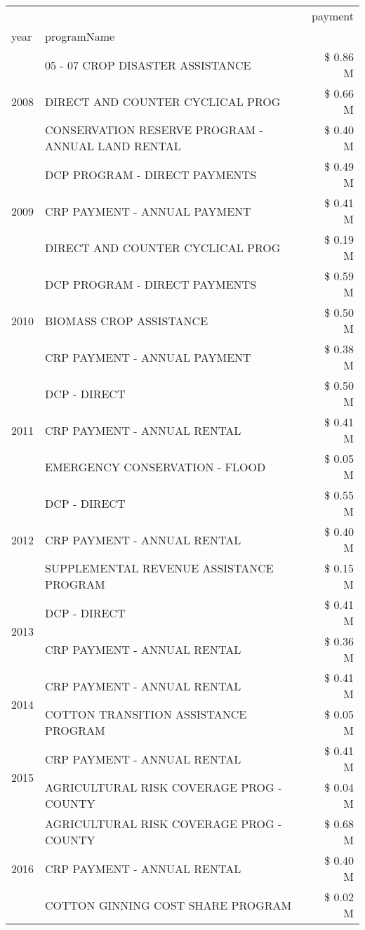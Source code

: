 \begin{tabular}{llr}
\toprule
 &  & payment \\
year & programName &  \\
\midrule
\multirow[t]{3}{*}{2008} & 05 - 07 CROP DISASTER ASSISTANCE & \$ 0.86 M \\
 & DIRECT AND COUNTER CYCLICAL PROG & \$ 0.66 M \\
 & CONSERVATION RESERVE PROGRAM - ANNUAL LAND RENTAL & \$ 0.40 M \\
\cline{1-3}
\multirow[t]{3}{*}{2009} & DCP PROGRAM - DIRECT PAYMENTS & \$ 0.49 M \\
 & CRP PAYMENT - ANNUAL PAYMENT & \$ 0.41 M \\
 & DIRECT AND COUNTER CYCLICAL PROG & \$ 0.19 M \\
\cline{1-3}
\multirow[t]{3}{*}{2010} & DCP PROGRAM - DIRECT PAYMENTS & \$ 0.59 M \\
 & BIOMASS CROP ASSISTANCE & \$ 0.50 M \\
 & CRP PAYMENT - ANNUAL PAYMENT & \$ 0.38 M \\
\cline{1-3}
\multirow[t]{3}{*}{2011} & DCP - DIRECT & \$ 0.50 M \\
 & CRP PAYMENT - ANNUAL RENTAL & \$ 0.41 M \\
 & EMERGENCY CONSERVATION - FLOOD & \$ 0.05 M \\
\cline{1-3}
\multirow[t]{3}{*}{2012} & DCP - DIRECT & \$ 0.55 M \\
 & CRP PAYMENT - ANNUAL RENTAL & \$ 0.40 M \\
 & SUPPLEMENTAL REVENUE ASSISTANCE PROGRAM & \$ 0.15 M \\
\cline{1-3}
\multirow[t]{2}{*}{2013} & DCP - DIRECT & \$ 0.41 M \\
 & CRP PAYMENT - ANNUAL RENTAL & \$ 0.36 M \\
\cline{1-3}
\multirow[t]{2}{*}{2014} & CRP PAYMENT - ANNUAL RENTAL & \$ 0.41 M \\
 & COTTON TRANSITION ASSISTANCE PROGRAM & \$ 0.05 M \\
\cline{1-3}
\multirow[t]{2}{*}{2015} & CRP PAYMENT - ANNUAL RENTAL & \$ 0.41 M \\
 & AGRICULTURAL RISK COVERAGE PROG - COUNTY & \$ 0.04 M \\
\cline{1-3}
\multirow[t]{3}{*}{2016} & AGRICULTURAL RISK COVERAGE PROG - COUNTY & \$ 0.68 M \\
 & CRP PAYMENT - ANNUAL RENTAL & \$ 0.40 M \\
 & COTTON GINNING COST SHARE PROGRAM & \$ 0.02 M \\

\end{tabular}

